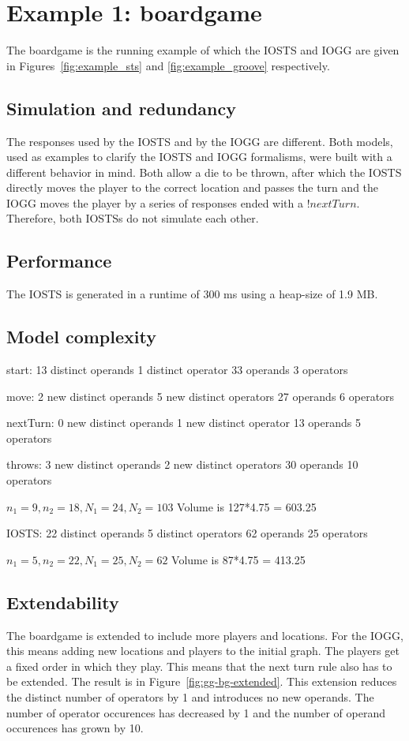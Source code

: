 \section{Example 1: boardgame}
The boardgame is the running example of which the IOSTS and IOGG are given in Figures~\ref{fig:example_sts} and \ref{fig:example_groove} respectively.

\subsection{Simulation and redundancy}
The responses used by the IOSTS and by the IOGG are different. Both models, used as examples to clarify the IOSTS and IOGG formalisms, were built with a different behavior in mind. Both allow a die to be thrown, after which the IOSTS directly moves the player to the correct location and passes the turn and the IOGG moves the player by a series of responses ended with a $!nextTurn$. Therefore, both IOSTSs do not simulate each other.

\subsection{Performance}
The IOSTS is generated in a runtime of 300 ms using a heap-size of 1.9 MB.

\subsection{Model complexity}
start:
13 distinct operands
1 distinct operator
33 operands
3 operators

move:
2 new distinct operands
5 new distinct operators
27 operands
6 operators

nextTurn:
0 new distinct operands
1 new distinct operator
13 operands
5 operators

throws:
3 new distinct operands
2 new distinct operators
30 operands
10 operators

$n_1 = 9, n_2 = 18, N_1 = 24, N_2 = 103$ Volume is 127*4.75 = 603.25

IOSTS:
22 distinct operands
5 distinct operators
62 operands
25 operators

$n_1 = 5, n_2 = 22, N_1 = 25, N_2 = 62$ Volume is 87*4.75 = 413.25


\subsection{Extendability}
The boardgame is extended to include more players and locations. For the IOGG, this means adding new locations and players to the initial graph. The players get a fixed order in which they play. This means that the next turn rule also has to be extended. The result is in Figure~\ref{fig:gg-bg-extended}. This extension reduces the distinct number of operators by 1 and introduces no new operands. The number of operator occurences has decreased by 1 and the number of operand occurences has grown by 10.

